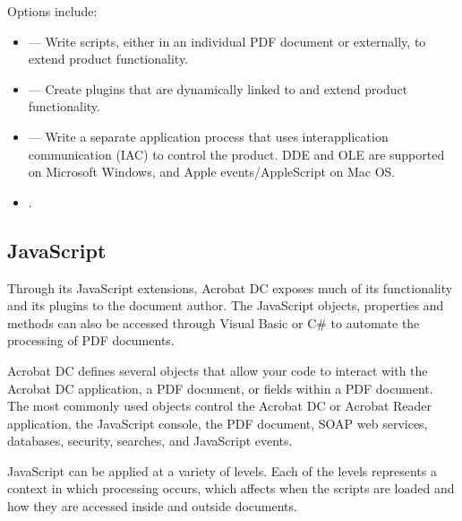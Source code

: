 \documentclass[letterpaper,12pt,english,openany,oneside]{sphinxmanual}
\begin{document}
Options include:
\begin{itemize}
\item {} 
 — Write scripts, either in an individual PDF document or externally, to extend product functionality.

\item {} 
 — Create plug\sphinxhyphen{}ins that are dynamically linked to and extend product functionality.

\item {} 
 — Write a separate application process that uses interapplication communication (IAC) to control the product. DDE and OLE are supported on Microsoft Windows, and Apple events/AppleScript on Mac OS.

\item {} 
   .

\end{itemize}




\subsection{JavaScript}
\label{\detokenize{index:javascript}}
Through its JavaScript extensions, Acrobat DC exposes much of its functionality and its plug\sphinxhyphen{}ins to the document author. The JavaScript objects, properties and methods can also be accessed through Visual Basic or C\# to automate the processing of PDF documents.

Acrobat DC defines several objects that allow your code to interact with the Acrobat DC application, a PDF document, or fields within a PDF document. The most commonly used objects control the Acrobat DC or Acrobat Reader application, the JavaScript console, the PDF document, SOAP web services, databases, security, searches, and JavaScript events.

JavaScript can be applied at a variety of levels. Each of the levels represents a context in which processing occurs, which affects when the scripts are loaded and how they are accessed inside and outside documents.
\end{document}
